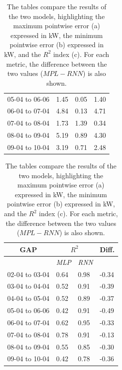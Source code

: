 \begin{table}[H]
\begin{minipage}[t]{.45\textwidth}
\begin{tabular}[t]{l|l|l|l}
			05-04 to 06-06                         & 1.45         & 0.05         & 1.40  \\
			06-04 to 07-04                         & 4.84         & 0.13         & 4.71  \\
			07-04 to 08-04                         & 1.73         & 1.39         & 0.34  \\
			08-04 to 09-04                         & 5.19         & 0.89         & 4.30  \\
			09-04 to 10-04                         & 3.19         & 0.71         & 2.48
		\end{tabular}
		\caption*{(b)}
	\end{minipage}
	\begin{minipage}{\textwidth}
		\centering
		\begin{tabular}[t]{l|l|l|l}
			\multicolumn{1}{c|}{\textbf{GAP}}   &
			\multicolumn{2}{c|}{\textbf{$R^2$}} &
			\multicolumn{1}{c}{\textbf{Diff.}}                                        \\
			\hline
			                                    & \textit{MLP} & \textit{RNN} &       \\
			02-04 to 03-04                      & 0.64         & 0.98         & -0.34 \\
			03-04 to 04-04                      & 0.52         & 0.91         & -0.39 \\
			04-04 to 05-04                      & 0.52         & 0.89         & -0.37 \\
			05-04 to 06-06                      & 0.42         & 0.91         & -0.49 \\
			06-04 to 07-04                      & 0.62         & 0.95         & -0.33 \\
			07-04 to 08-04                      & 0.78         & 0.91         & -0.13 \\
			08-04 to 09-04                      & 0.55         & 0.85         & -0.30 \\
			09-04 to 10-04                      & 0.42         & 0.78         & -0.36
		\end{tabular}
		\caption*{(c)}
	\end{minipage}

	\caption{The tables compare the results of the two models, highlighting the maximum pointwise error (a) expressed in kW, the minimum pointwise error (b) expressed in kW, and the $R^2$ index (c). For each metric, the difference between the two values ($MPL - RNN$) is also shown.}
\end{table}


